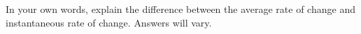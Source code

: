 {In your own words, explain the difference between the average rate of change and instantaneous rate of change.}
{Answers will vary.}
